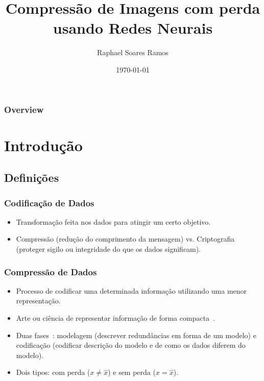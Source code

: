\documentclass{beamer}
\title[Trabalho de Graduação 2]{Compressão de Imagens com perda usando Redes Neurais} %
\author[Raphael Soares Ramos]{Raphael Soares Ramos} %
\institute[UnB] %
{
Universidade de Brasília \\ %
\medskip
\textit{raphael.soares@nubank.com.br} %
}
\date{\today} %
\begin{document}
\begin{frame}
\titlepage %
\end{frame}

\begin{frame}[allowframebreaks]
\frametitle{Overview} %
\tableofcontents %
\end{frame}


\section{Introdução}
\subsection{Definições}
\begin{frame}
\frametitle{Codificação de Dados}
\begin{itemize}
\item Transformação feita nos dados para atingir um certo objetivo.
\item Compressão (redução do comprimento da mensagem) vs. Criptografia (proteger sigilo ou integridade do que os dados significam).
\end{itemize}
\end{frame}
\begin{frame}
\frametitle{Compressão de Dados}
\begin{itemize}
\item Processo de codificar uma determinada informação utilizando uma menor representação.
\item Arte ou ciência de representar informação de forma compacta~\cite{book_compression}.
\item Duas fases~\cite{book_compression}: modelagem (descrever redundâncias em forma de um modelo) e codificação (codificar descrição do modelo e de como os dados diferem do modelo).
\item Dois tipos: com perda ($x \neq \hat{x}$) e sem perda ($x = \hat{x}$).
\end{itemize}
\end{frame}
\end{document}
